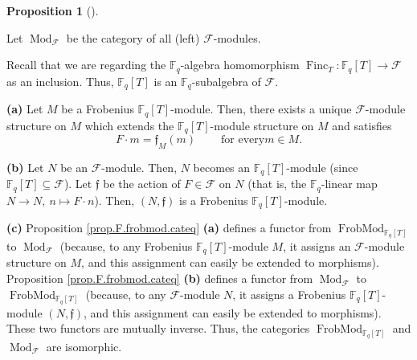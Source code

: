 \documentclass[numbers=enddot,12pt,final,onecolumn,notitlepage]{scrartcl}%
\theoremstyle{definition}
\newtheorem{prop}[theo]{Proposition}
\newenvironment{proposition}[1][]
{\begin{prop}[#1]\begin{leftbar}}
{\end{leftbar}\end{prop}}
\begin{document}
\begin{proposition}
\label{prop.F.frobmod.cateq}Let $\operatorname*{Mod}\nolimits_{\mathcal{F}}$
be the category of all (left) $\mathcal{F}$-modules.

Recall that we are regarding the $\mathbb{F}_{q}$-algebra homomorphism
$\operatorname*{Finc}\nolimits_{T}:\mathbb{F}_{q}\left[  T\right]
\rightarrow\mathcal{F}$ as an inclusion. Thus, $\mathbb{F}_{q}\left[
T\right]  $ is an $\mathbb{F}_{q}$-subalgebra of $\mathcal{F}$.

\textbf{(a)} Let $M$ be a Frobenius $\mathbb{F}_{q}\left[  T\right]  $-module.
Then, there exists a unique $\mathcal{F}$-module structure on $M$ which
extends the $\mathbb{F}_{q}\left[  T\right]  $-module structure on $M$ and
satisfies%
\[
F\cdot m=\mathfrak{f}_{M}\left(  m\right)  \ \ \ \ \ \ \ \ \ \ \text{for every
}m\in M.
\]


\textbf{(b)} Let $N$ be an $\mathcal{F}$-module. Then, $N$ becomes an
$\mathbb{F}_{q}\left[  T\right]  $-module (since $\mathbb{F}_{q}\left[
T\right]  \subseteq\mathcal{F}$). Let $\mathfrak{f}$ be the action of
$F\in\mathcal{F}$ on $N$ (that is, the $\mathbb{F}_{q}$-linear map
$N\rightarrow N,\ n\mapsto F\cdot n$). Then, $\left(  N,\mathfrak{f}\right)  $
is a Frobenius $\mathbb{F}_{q}\left[  T\right]  $-module.

\textbf{(c)} Proposition \ref{prop.F.frobmod.cateq} \textbf{(a)} defines a
functor from $\operatorname*{FrobMod}\nolimits_{\mathbb{F}_{q}\left[
T\right]  }$ to $\operatorname*{Mod}\nolimits_{\mathcal{F}}$ (because, to any
Frobenius $\mathbb{F}_{q}\left[  T\right]  $-module $M$, it assigns an
$\mathcal{F}$-module structure on $M$, and this assignment can easily be
extended to morphisms). Proposition \ref{prop.F.frobmod.cateq} \textbf{(b)}
defines a functor from $\operatorname*{Mod}\nolimits_{\mathcal{F}}$ to
$\operatorname*{FrobMod}\nolimits_{\mathbb{F}_{q}\left[  T\right]  }$
(because, to any $\mathcal{F}$-module $N$, it assigns a Frobenius
$\mathbb{F}_{q}\left[  T\right]  $-module $\left(  N,\mathfrak{f}\right)  $,
and this assignment can easily be extended to morphisms). These two functors
are mutually inverse. Thus, the categories $\operatorname*{FrobMod}%
\nolimits_{\mathbb{F}_{q}\left[  T\right]  }$ and $\operatorname*{Mod}%
\nolimits_{\mathcal{F}}$ are isomorphic.
\end{proposition}
\end{document}
